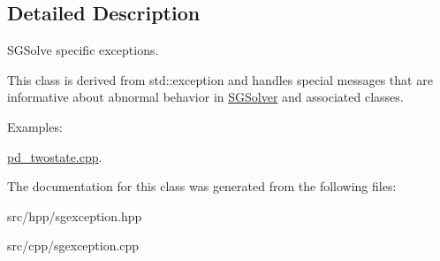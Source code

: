 \subsection{Detailed Description}
S\+G\+Solve specific exceptions. 

This class is derived from std\+::exception and handles special messages that are informative about abnormal behavior in \hyperlink{classSGSolver}{S\+G\+Solver} and associated classes. \begin{Desc}
\item[Examples\+: ]\par
\hyperlink{pd_twostate_8cpp-example}{pd\+\_\+twostate.\+cpp}.\end{Desc}


The documentation for this class was generated from the following files\+:\begin{DoxyCompactItemize}
\item 
src/hpp/sgexception.\+hpp\item 
src/cpp/sgexception.\+cpp\end{DoxyCompactItemize}
